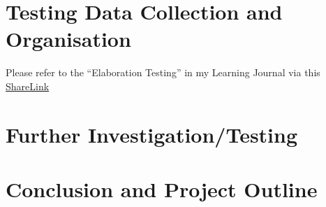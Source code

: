 \documentclass{article}
\begin{document}
\section{Testing Data Collection and Organisation}

Please refer to the ``Elaboration Testing'' in my Learning Journal via this \href{https://www.overleaf.com/read/vgmsjfphycpq}{ShareLink}


\section{Further Investigation/Testing}

\section{Conclusion and Project Outline}
\end{document}

